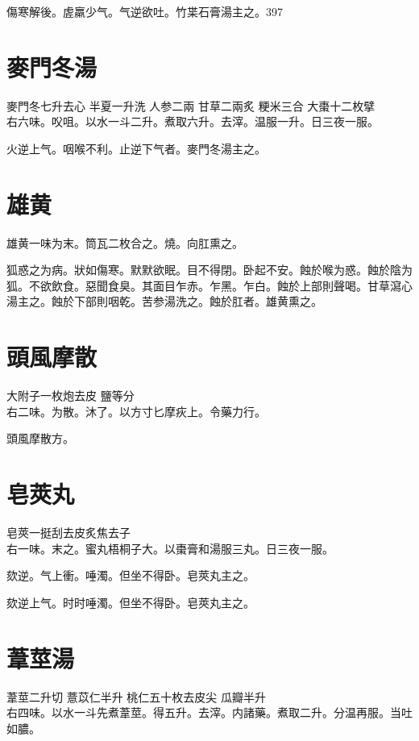 傷寒解後。虗羸少气。气逆欲吐。竹枼石膏湯主之。397

\section{麥門冬湯}

麥門冬{\scriptsize 七升去心} 半夏{\scriptsize 一升洗} 人参{\scriptsize 二兩} 甘草{\scriptsize 二兩炙} 粳米{\scriptsize 三合} 大棗{\scriptsize 十二枚擘}\\
右六味。㕮咀。以水一斗二升。煮取六升。去滓。温服一升。日三夜一服。

火逆上气。咽喉不利。止逆下气者。麥門冬湯主之。

\section{雄黄}

雄黄一味为末。筒瓦二枚合之。燒。向肛熏之。

狐惑之为病。狀如傷寒。默默欲眠。目不得閉。卧起不安。蝕於喉为惑。蝕於陰为狐。不欲飲食。惡聞食臭。其面目乍赤。乍黑。乍白。蝕於上部則聲喝。甘草瀉心湯主之。蝕於下部則咽乾。苦参湯洗之。蝕於肛者。雄黄熏之。

\section{頭風摩散}

大附子{\scriptsize 一枚炮去皮} 鹽{\scriptsize 等分}\\
右二味。为散。沐了。以方寸匕摩疢上。令藥力行。

頭風摩散方。

\section{皂莢丸}

皂莢{\scriptsize 一挺刮去皮炙焦去子}\\
右一味。末之。蜜丸梧桐子大。以棗膏和湯服三丸。日三夜一服。{\wuben}

{\dengben}

欬逆。气上衝。唾濁。但坐不得卧。皂莢丸主之。{\wuben}

欬逆上气。时时唾濁。但坐不得卧。皂莢丸主之。{\dengben}

\section{葦莖湯}

葦莖{\scriptsize 二升切} 薏苡仁{\scriptsize 半升} 桃仁{\scriptsize 五十枚去皮尖} 瓜瓣{\scriptsize 半升}\\
右四味。以水一斗先煮葦莖。得五升。去滓。内諸藥。煮取二升。分温再服。当吐如膿。

